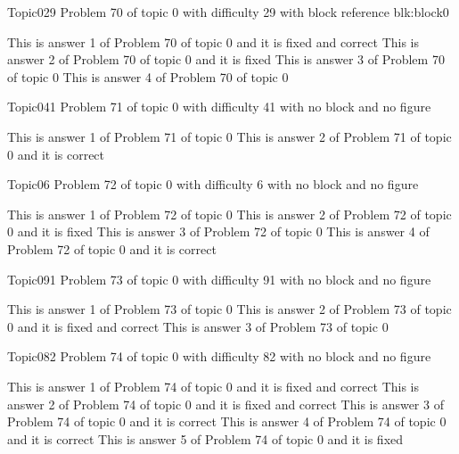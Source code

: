 \documentclass[master]{exam}
\begin{document}
\begin{problem}[requires=blk:block0]{Topic0}{29}
	Problem 70 of topic 0 with difficulty 29 with block reference blk:block0
	\begin{answers}
		 This is answer 1 of Problem 70 of topic 0 and it is fixed and correct
		\answer[fixed] This is answer 2 of Problem 70 of topic 0 and it is fixed
		\answer This is answer 3 of Problem 70 of topic 0 
		\answer This is answer 4 of Problem 70 of topic 0 
	\end{answers}
\end{problem}

\begin{problem}{Topic0}{41}
	Problem 71 of topic 0 with difficulty 41 with no block and no figure
	\begin{answers}
		\answer This is answer 1 of Problem 71 of topic 0 
		\answer[correct] This is answer 2 of Problem 71 of topic 0 and it is correct
	\end{answers}
\end{problem}

\begin{problem}{Topic0}{6}
	Problem 72 of topic 0 with difficulty 6 with no block and no figure
	\begin{answers}
		\answer This is answer 1 of Problem 72 of topic 0 
		\answer[fixed] This is answer 2 of Problem 72 of topic 0 and it is fixed
		\answer This is answer 3 of Problem 72 of topic 0 
		\answer[correct] This is answer 4 of Problem 72 of topic 0 and it is correct
	\end{answers}
\end{problem}

\begin{problem}{Topic0}{91}
	Problem 73 of topic 0 with difficulty 91 with no block and no figure
	\begin{answers}
		\answer This is answer 1 of Problem 73 of topic 0 
		 This is answer 2 of Problem 73 of topic 0 and it is fixed and correct
		\answer This is answer 3 of Problem 73 of topic 0 
	\end{answers}
\end{problem}

\begin{problem}{Topic0}{82}
	Problem 74 of topic 0 with difficulty 82 with no block and no figure
	\begin{answers}
		 This is answer 1 of Problem 74 of topic 0 and it is fixed and correct
		 This is answer 2 of Problem 74 of topic 0 and it is fixed and correct
		\answer[correct] This is answer 3 of Problem 74 of topic 0 and it is correct
		\answer[correct] This is answer 4 of Problem 74 of topic 0 and it is correct
		\answer[fixed] This is answer 5 of Problem 74 of topic 0 and it is fixed
	\end{answers}
\end{problem}
\end{document}
